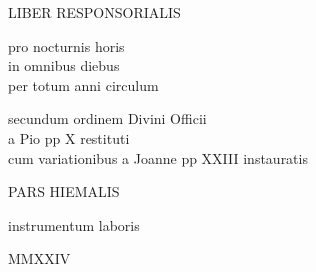 \documentclass[liber-responsorialis_hiemalis.tex]{subfiles}
\begin{document}
\begin{titlepage}
\begin{center}
\null\vspace{4cm}

{\Huge{}LIBER RESPONSORIALIS}

\vspace{1cm}

{\Large\sc{}pro nocturnis horis\\in omnibus diebus\\per totum anni circulum}

\vspace{5mm}

{\large\sc{}secundum ordinem Divini Officii\\a Pio pp X restituti\\cum variationibus a Joanne pp XXIII instauratis}

\vspace{5mm}

{\Large\sc{}PARS HIEMALIS}

\vspace{3.5cm}

{\large\sc{}instrumentum laboris}

\vfill

MMXXIV

\end{center}
\end{titlepage}

\null


\end{document}
